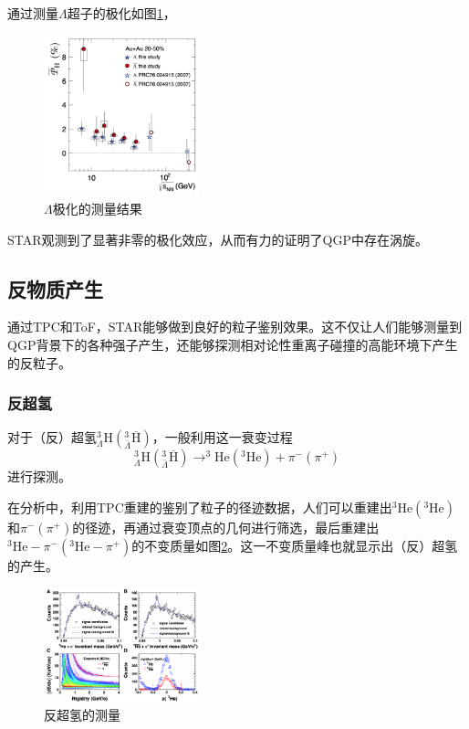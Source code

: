\documentclass[%
 reprint,
 amsmath,amssymb,
 aps,
]{revtex4-1}
\begin{document}
\begin{description}
    通过测量$\Lambda$超子的极化如图\ref{fig:Lambda}，
    \begin{figure}[htbp]
        \includegraphics[width=0.4\textwidth]{Plots/Lambda.png}
        \caption{\label{fig:Lambda}$\Lambda$极化的测量结果}
    \end{figure} 
    STAR观测到了显著非零的极化效应，从而有力的证明了QGP中存在涡旋。
\end{description}
\subsection{\label{sec:antimatter}反物质产生}
通过TPC和ToF，STAR能够做到良好的粒子鉴别效果。这不仅让人们能够测量到QGP背景下的各种强子产生，还能够探测相对论性重离子碰撞的高能环境下产生的反粒子。
\subsubsection{\label{sec:antihypertritons}反超氢}
对于（反）超氢$^3_\Lambda \text{H}(^3_{\bar\Lambda} \overline{\text{H}})$，一般利用这一衰变过程
\begin{equation}
    ^3_\Lambda \text{H}(^3_{\bar\Lambda} \overline{\text{H}}) \to  ^3\text{He}(^3\text{He})+\pi^-(\pi^+)
\end{equation}
进行探测。

在分析中，利用TPC重建的鉴别了粒子的径迹数据，人们可以重建出$^3\text{He}(^3\text{He})$和$\pi^-(\pi^+)$的径迹，再通过衰变顶点的几何进行筛选，最后重建出$^3\text{He}-\pi^-(^3\text{He}-\pi^+)$的不变质量如图\ref{fig:Hyperon}。这一不变质量峰也就显示出（反）超氢的产生。
\begin{figure}[htbp]
    \includegraphics[width=0.4\textwidth]{Plots/Hyperon.png}
    \caption{\label{fig:Hyperon}反超氢的测量}
\end{figure}
\end{document}
